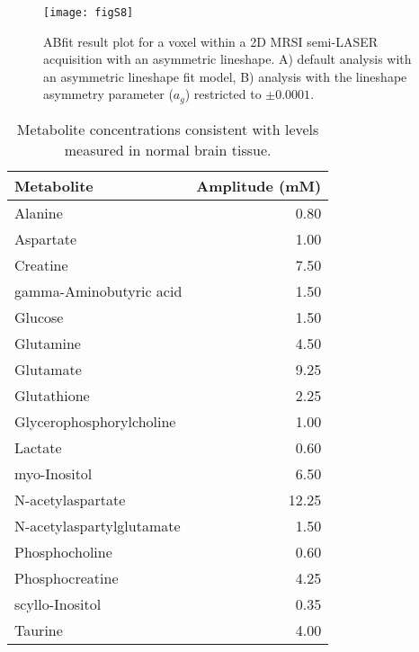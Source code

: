 \documentclass[num-refs]{wiley-article}
\begin{document}
\begin{figure}
  \begin{center}
    \texttt{[image: figS8]}
    \caption{ABfit result plot for a voxel within a 2D MRSI semi-LASER acquisition with an asymmetric lineshape. A) default analysis with an asymmetric lineshape fit model, B) analysis with the lineshape asymmetry parameter ($a_{g}$) restricted to $\pm 0.0001$.}
    \label{lineshape_res}
  \end{center}
\end{figure}

\begin{table}[ht]
\begin{center}
\begin{tabular}{l r}
  \hline
  Metabolite & Amplitude (mM) \\
  \hline
  Alanine & 0.80 \\
  Aspartate & 1.00 \\
  Creatine & 7.50 \\
  gamma-Aminobutyric acid & 1.50 \\
  Glucose & 1.50 \\
  Glutamine & 4.50 \\
  Glutamate & 9.25 \\
  Glutathione & 2.25 \\
  Glycerophosphorylcholine & 1.00 \\
  Lactate & 0.60 \\
  myo-Inositol & 6.50 \\
  N-acetylaspartate & 12.25 \\
  N-acetylaspartylglutamate & 1.50 \\
  Phosphocholine & 0.60 \\
  Phosphocreatine & 4.25 \\
  scyllo-Inositol & 0.35 \\
  Taurine & 4.00 \\
  \hline
\end{tabular}
\end{center}
\caption{Metabolite concentrations consistent with levels measured in normal brain tissue.}
\label{metab_tab}
\end{table}
\end{document}
